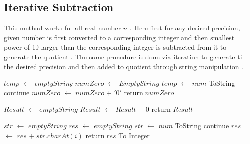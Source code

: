 \documentclass[twocolumn]{article}      %
\begin{document}
\subsection{Iterative Subtraction}
This method works for all real number $n$ . Here first for any desired precision, given number is first converted to a corresponding integer and then smallest power of 10 larger than the corresponding integer is subtracted from it to generate the quotient . The same procedure is done via iteration to generate till the desired precision and then added to quotient through string manipulation .
\newpage
\begin{algorithm}
\begin{algorithmic}
\State $temp$ $\gets$ $emptyString$
\State $numZero$ $\gets$ $EmptyString$
\State $temp$ $\gets$ $num$ ToString
\State continue
\State $numZero$ $\gets$ $numZero$ $+$ $'0'$
\EndIf
\EndFor
\State return $numZero$
\end{algorithmic}
\end{algorithm}
\begin{algorithm}
\begin{algorithmic}
\State $Result$ $\gets$ $emptyString$
\State $Result$ $\gets$ $Result$ $+$ $0$
\EndFor
\State return $Result$
\end{algorithmic}
\end{algorithm}
\begin{algorithm}
\begin{algorithmic}
\State $str$ $\gets$ $emptyString$
\State $res$ $\gets$ $emptyString$
\State $str$ $\gets$ $num$ ToString
\State continue
\State $res$ $\gets$ $res$ $+$ $str.charAt(i)$
\EndIf
\EndFor
\State return $res$ To Integer
\end{algorithmic}
\end{algorithm}
\end{document}
